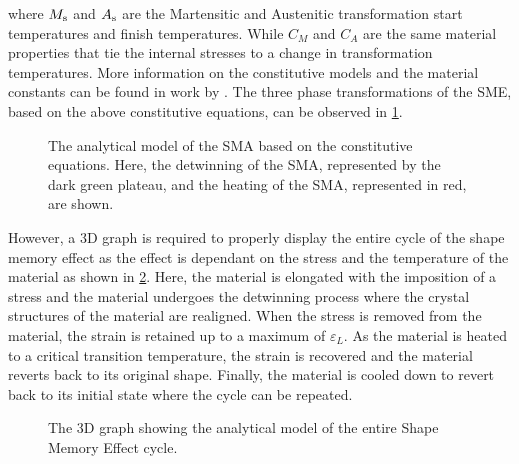 where $M_\mathrm{s}$ and $A_\mathrm{s}$ are the Martensitic and Austenitic transformation start temperatures and finish temperatures. While $C_M$ and $C_A$ are the same material properties that tie the internal stresses to a change in transformation temperatures. More information on the constitutive models and the material constants can be found in work by \cite{brinsonOneDimensionalConstitutiveBehavior1993}. The three phase transformations of the SME, based on the above constitutive equations, can be observed in \cref{fig:brinson-model-stress-strain}.
\begin{figure}[hbt]
    \centering
    \resizebox{0.75\textwidth}{!}{}
    \caption{The analytical model of the SMA based on the \cite{brinsonOneDimensionalConstitutiveBehavior1993} constitutive equations. Here, the detwinning of the SMA, represented by the dark green plateau, and the heating of the SMA, represented in red, are shown.}
    \label{fig:brinson-model-stress-strain}
\end{figure}

However, a 3D graph is required to properly display the entire cycle of the shape memory effect as the effect is dependant on the stress and the temperature of the material as shown in \cref{fig:brinson-model-3d}. Here, the material is elongated with the imposition of a stress and the material undergoes the detwinning process where the crystal structures of the material are realigned. When the stress is removed from the material, the strain is retained up to a maximum of $\varepsilon_L$. As the material is heated to a critical transition temperature, the strain is recovered and the material reverts back to its original shape. Finally, the material is cooled down to revert back to its initial state where the cycle can be repeated.

\begin{figure}[hbt]
    \centering
    \resizebox{0.85\textwidth}{!}{}
    \caption{The 3D graph showing the \cite{brinsonOneDimensionalConstitutiveBehavior1993} analytical model of the entire Shape Memory Effect cycle.}
    \label{fig:brinson-model-3d}
\end{figure}

